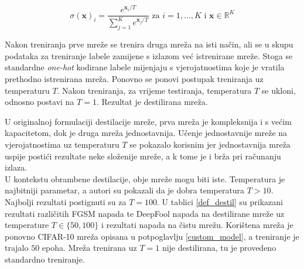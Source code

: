 \documentclass[utf8, diplomski]{fer}
\begin{document}
\begin{equation}\label{softmax_t}
	\sigma(\boldsymbol{x})_{i} = \frac{e^{\boldsymbol{x}_{i} / T}}{\sum_{j=1}^{K}e^{\boldsymbol{x}_{j} / T}} \text{ za } i = 1, ..., K \text{ i } \boldsymbol{x} \in \mathbb{R}^{K}
\end{equation}

Nakon treniranja prve mreže se trenira druga mreža na isti način, ali se u skupu podataka za treniranje labele zamijene s izlazom već istrenirane mreže. Stoga se standardne \textit{one-hot} kodirane labele mijenjaju s vjerojatnostima koje je vratila prethodno istrenirana mreža. Ponovno se ponovi postupak treniranja uz temperaturu $T$. Nakon treniranja, za vrijeme testiranja, temperatura $T$ se ukloni, odnosno postavi na $T = 1$. Rezultat je destilirana mreža. \par
U originalnoj formulaciji destilacije mreže, prva mreža je kompleksnija i s većim kapacitetom, dok je druga mreža jednostavnija. Učenje jednostavnije mreže na vjerojatnostima uz temperaturu $T$ se pokazalo korisnim jer jednostavnija mreža uspije postići rezultate neke složenije mreže, a k tome je i brža pri računanju izlaza. \\
U kontekstu obrambene destilacije, obje mreže mogu biti iste. Temperatura je najbitniji parametar, a autori su pokazali da je dobra temperatura $T > 10$. Najbolji rezultati postignuti su za $T = 100$. U tablici \ref{def_destil} su prikazani rezultati različitih FGSM napada te DeepFool napada na destilirane mreže uz temperature $T \in \{50, 100\}$ i rezultati napada na čistu mrežu. Korištena mreža je ponovno CIFAR-10 mreža opisana u potpoglavlju \ref{custom_model}, a treniranje je trajalo $50$ epoha. Mreža trenirana uz $T = 1$ nije destilirana, tu je provedeno standardno treniranje.
\end{document}
